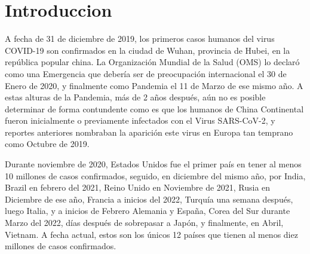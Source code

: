 
\section{Introduccion}
A fecha de 31 de diciembre de 2019, los primeros casos humanos del virus COVID-19 son confirmados en la ciudad de Wuhan, provincia de Hubei, en la república popular china. La Organización Mundial de la Salud (OMS) lo declaró como una Emergencia que debería ser de preocupación internacional el 30 de Enero de 2020, y finalmente como Pandemia el 11 de Marzo de ese mismo año. A estas alturas de la Pandemia, más de 2 años después, aún no es posible determinar de forma contundente como es que los humanos de China Continental fueron inicialmente o previamente infectados con el Virus SARS-CoV-2, y reportes anteriores nombraban la aparición este virus en Europa tan temprano como Octubre de 2019.\cite{sakay_2021}

Durante noviembre de 2020, Estados Unidos fue el primer país en tener al menos 10 millones de casos confirmados, seguido, en diciembre del mismo año, por India, Brazil en febrero del 2021, Reino Unido en Noviembre de 2021, Rusia en Diciembre de ese año, Francia a inicios del 2022, Turquía una semana después, luego Italia, y a inicios de Febrero Alemania y España, Corea del Sur durante Marzo del 2022, días después de sobrepasar a Japón, y finalmente, en Abril, Vietnam. A fecha actual, estos son los únicos 12 países que tienen al menos diez millones de casos confirmados.